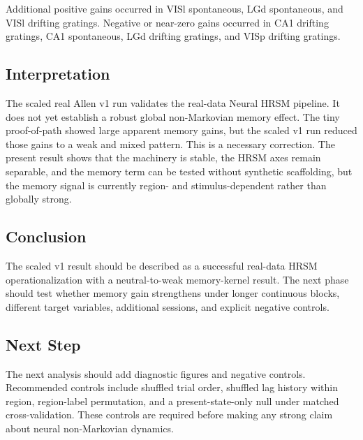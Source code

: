 Additional positive gains occurred in VISl spontaneous, LGd spontaneous, and VISl drifting gratings. Negative or near-zero gains occurred in CA1 drifting gratings, CA1 spontaneous, LGd drifting gratings, and VISp drifting gratings.

\subsection{Interpretation}

The scaled real Allen v1 run validates the real-data Neural HRSM pipeline. It does not yet establish a robust global non-Markovian memory effect. The tiny proof-of-path showed large apparent memory gains, but the scaled v1 run reduced those gains to a weak and mixed pattern. This is a necessary correction. The present result shows that the machinery is stable, the HRSM axes remain separable, and the memory term can be tested without synthetic scaffolding, but the memory signal is currently region- and stimulus-dependent rather than globally strong.

\subsection{Conclusion}

The scaled v1 result should be described as a successful real-data HRSM operationalization with a neutral-to-weak memory-kernel result. The next phase should test whether memory gain strengthens under longer continuous blocks, different target variables, additional sessions, and explicit negative controls.

\subsection{Next Step}

The next analysis should add diagnostic figures and negative controls. Recommended controls include shuffled trial order, shuffled lag history within region, region-label permutation, and a present-state-only null under matched cross-validation. These controls are required before making any strong claim about neural non-Markovian dynamics.
